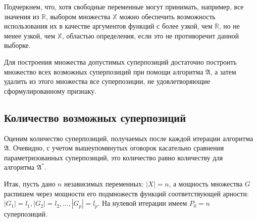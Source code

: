 \documentclass[12pt,a4paper]{article}
\begin{document}
Подчеркнем, что, хотя свободные переменные могут принимать, например, все
значения из $\mathbb{R}$, выбором множества $\mathbb{X}$ можно обеспечить
возможность использования их в качестве аргументов функций с более узкой,
чем $\mathbb{R}$, но не менее узкой, чем $\mathbb{X}$, областью определения,
если это не противоречит данной выборке.

Для построения множества допустимых суперпозиций достаточно построить
множество всех возможных суперпозиций при помощи алгоритма $\mathfrak{A}$,
а затем удалить из этого множества все суперпозиции, не удовлетворяющие
сформулированному признаку.

\subsection{Количество возможных суперпозиций}

Оценим количество суперпозиций, получаемых после каждой итерации алгоритма
$\mathfrak{A}$. Очевидно, с учетом вышеупомянутых оговорок касательно сравнения
параметризованных суперпозиций, это количество равно количеству для алгоритма
$\mathfrak{A^*}$.

Итак, пусть дано $n$ независимых переменных: $| X | = n$, а мощность
множества $G$ распишем через мощности его подмножеств функций соответствующей
арности: $| G_1 | = l_1, | G_2 | = l_2, \dots, | G_p | = l_p$. На нулевой
итерации имеем $P_0 = n$ суперпозиций.
\end{document}
